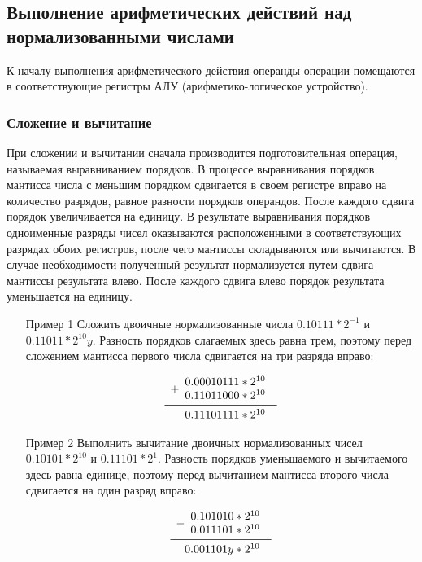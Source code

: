 \documentclass[a4paper]{article}
\begin{document}
\subsection{Выполнение арифметических действий над нормализованными числами}

К началу выполнения арифметического действия операнды операции помещаются в соответствующие регистры АЛУ (арифметико-логическое устройство).
\subsubsection{Сложение и вычитание}
При сложении и вычитании сначала производится подготовительная операция, называемая выравниванием порядков. В процессе выравнивания порядков мантисса числа с меньшим порядком сдвигается в своем регистре вправо на количество разрядов, равное разности порядков операндов. После каждого сдвига порядок увеличивается на единицу. В результате выравнивания порядков одноименные разряды чисел оказываются расположенными в соответствующих разрядах обоих регистров, после чего мантиссы складываются или вычитаются. В случае необходимости полученный результат нормализуется путем сдвига мантиссы результата влево. После каждого сдвига влево порядок результата уменьшается на единицу.
\begin{itemize}
\item[Пример 1] Сложить двоичные нормализованные числа $0.10111 * 2^{-1}$ и $0.11011*2^{10}y$. Разность порядков слагаемых здесь равна трем, поэтому перед сложением мантисса первого числа сдвигается на три разряда вправо:

\[
\begin{array}{r}
+
\begin{array}{r}
0.00010111 * 2^{10}\\
0.11011000 * 2^{10}\\
\end{array} \\
\midrule
\begin{array}{r}
0.11101111 * 2^{10}
\end{array}
\end{array}
\]

\item[Пример 2] Выполнить вычитание двоичных нормализованных чисел $0.10101*2^{10}$ и $0.11101*2^{1}$. Разность порядков уменьшаемого и вычитаемого здесь равна единице, поэтому перед вычитанием мантисса второго числа сдвигается на один разряд вправо:

\[
\begin{array}{r}
-
\begin{array}{r}
0.101010 * 2^{10}\\
0.011101 * 2^{10}\\
\end{array} \\
\midrule
\begin{array}{r}
0.001101y * 2^{10}
\end{array}
\end{array}
\]


\end{itemize}
\end{document}
